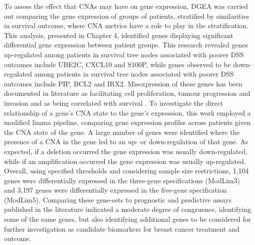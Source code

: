 To assess the effect that CNAs may have on gene expression, DGEA was carried out comparing the gene expression of groups of patients, stratified by similarities in survival outcome, where CNA metrics have a role to play in the stratification. This analysis, presented in Chapter 4, identified genes displaying significant differential gene expression between patient groups. This research revealed genes up-regulated among patients in survival tree nodes associated with poorer DSS outcomes include UBE2C, CXCL10 and S100P, while genes observed to be down-regulated among patients in survival tree nodes associated with poorer DSS outcomes include PIP, BCL2 and IRX2. Misexpression of these genes has been documented in literature as facilitating cell proliferation, tumour progression and invasion and as being correlated with survival \citep{pmid21195708, pmid31067633, pmid33681290, pmid20664598, pmid26560478, pmid30555735}. To investigate the direct relationship of a gene’s CNA state to the gene’s expression, this work employed a modified limma pipeline, comparing gene expression profiles across patients given the CNA state of the gene. A large number of genes were identified where the presence of a CNA in the gene led to an up- or down-regulation of that gene. As expected, if a deletion occurred the gene expression was usually down-regulated, while if an amplification occurred the gene expression was usually up-regulated. Overall, using specified thresholds and considering sample size restrictions, 1,104 genes were differentially expressed in the three-gene specifications (ModLim3) and 3,197 genes were differentially expressed in the five-gene specification (ModLim5). Comparing these gene-sets to prognostic and predictive assays published in the literature indicated a moderate degree of congruence, identifying some of the same genes, but also identifying additional genes to be considered for further investigation as candidate biomarkers for breast cancer treatment and outcome.   

